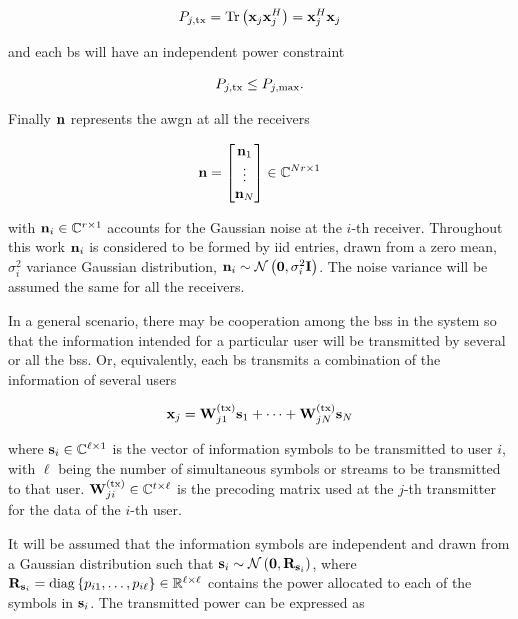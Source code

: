 \begin{equation} \label{eq:bs_tx_power}
P_{j,\tx} = \Tr \left(\xx_j \xx_j^H\right) = \xx_j^H \xx_j
\end{equation}

\noindent
and each \gls{bs} will have an independent power constraint

\begin{equation} \label{eq:pbpc_generic}
    P_{j,\tx} \leq P_{j, \max}.
\end{equation}

Finally $\nn$ represents the \gls{awgn} at all the receivers

\begin{equation} \label{eq:generic_noise}
    \nn = \begin{bmatrix}
        \nn_1 \\
        \vdots \\
        \nn_N
    \end{bmatrix} \in \C^{Nr \times 1}
\end{equation}

\noindent
with $\nn_i \in \C^{r \times 1}$ accounts for the Gaussian noise at the $i$-th
receiver. Throughout this work $\nn_i$ is considered to be formed by \gls{iid}
entries, drawn from a zero mean, $\sigma_i^2$ variance Gaussian distribution,
$\nn_i \sim \mathcal{N}\left(\zero, \sigma_i^2 \eye\right)$. The noise variance
will be assumed the same for all the receivers.

In a general scenario, there may be cooperation among the \glspl{bs} in the
system so that the information intended for a particular user will be
transmitted by several or all the \glspl{bs}. Or, equivalently, each \gls{bs}
transmits a combination of the information of several users

\begin{equation} \label{eq:generic_tx_precod}
    \xx_j = \Wtx_{j1} \ss_1 + \cdots + \Wtx_{jN} \ss_N
\end{equation}

\noindent
where $\ss_i \in \C^{\ell \times 1}$ is the vector of information symbols to be
transmitted to user $i$, with $\ell$ being the number of simultaneous symbols or
streams to be transmitted to that user. $\Wtx_{ji} \in \C^{t \times \ell}$ is
the precoding matrix used at the $j$-th transmitter for the data of the
$i$-th user.

It will be assumed that the information symbols are independent and drawn from a
Gaussian distribution such that $\ss_i \sim \mathcal{N}\left(\zero, \RR_{\ss_i}
\right)$, where $\RR_{\ss_i} = \diag\left\{p_{i1}, \ldots, p_{i\ell}\right\} \in
\R^{\ell \times \ell}$ contains the power allocated to each of the symbols in
$\ss_i$. The transmitted power can be expressed as

